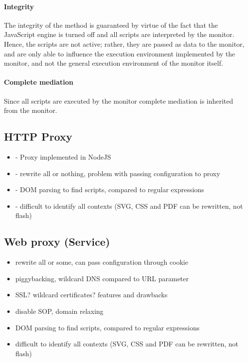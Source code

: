 \documentclass{llncs}
\begin{document}
\paragraph{Integrity} The integrity of the method is guaranteed by virtue of
the fact that the JavaScript engine is turned off and all scripts are
interpreted by the monitor. Hence, the scripts are not active; rather, they are
passed as data to the monitor, and are only able to influence the execution
environment implemented by the monitor, and not the general execution
environment of the monitor itself.

\paragraph{Complete mediation}

Since all scripts are executed by the monitor complete mediation is inherited 
from the monitor.


\subsection{HTTP Proxy}

\begin{itemize}
\item- Proxy implemented in NodeJS
\item- rewrite all or nothing, problem with passing configuration to proxy
\item- DOM parsing to find scripts, compared to regular expressions
\item- difficult to identify all contexts (SVG, CSS and PDF can be rewritten, not flash)
\end{itemize}



\subsection{Web proxy (Service)}

\begin{itemize}
\item rewrite all or some, can pass configuration through cookie
\item piggybacking, wildcard DNS compared to URL parameter
\item SSL? wildcard certificates? features and drawbacks 
\item disable SOP, domain relaxing
\item DOM parsing to find scripts, compared to regular expressions
\item difficult to identify all contexts (SVG, CSS and PDF can be rewritten, not flash)
\end{itemize}
\end{document}
